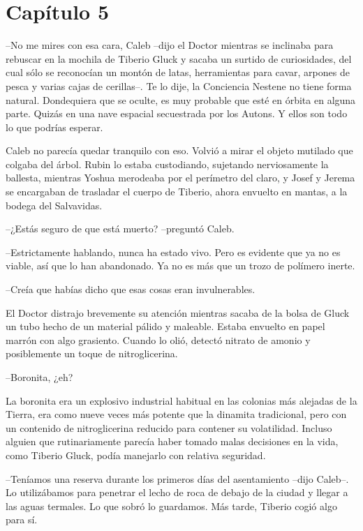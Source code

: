 \chapter*{Capítulo 5}

--No me mires con esa cara, Caleb --dijo el Doctor mientras se inclinaba para rebuscar en la mochila de Tiberio Gluck y sacaba un surtido de curiosidades, del cual sólo se reconocían un montón de latas, herramientas para cavar, arpones de pesca y varias cajas de cerillas--. Te lo dije, la Conciencia Nestene no tiene forma natural. Dondequiera que se oculte, es muy probable que esté en órbita en alguna parte. Quizás en una nave espacial secuestrada por los Autons. Y ellos son todo lo que podrías esperar.
 
Caleb no parecía quedar tranquilo con eso. Volvió a mirar el objeto mutilado que colgaba del árbol. Rubin lo estaba custodiando, sujetando nerviosamente la ballesta, mientras Yoshua merodeaba por el perímetro del claro, y Josef y Jerema se encargaban de trasladar el cuerpo de Tiberio, ahora envuelto en mantas, a la bodega del Salvavidas.
 
--¿Estás seguro de que está muerto? --preguntó Caleb.
 
--Estrictamente hablando, nunca ha estado vivo. Pero es evidente que ya no es viable, así que lo han abandonado. Ya no es más que un trozo de polímero inerte.
 
--Creía que habías dicho que esas cosas eran invulnerables.
 
El Doctor distrajo brevemente su atención mientras sacaba de la bolsa de Gluck un tubo hecho de un material pálido y maleable. Estaba envuelto en papel marrón con algo grasiento. Cuando lo olió, detectó nitrato de amonio y posiblemente un toque de nitroglicerina.
 
--Boronita, ¿eh?
 
La boronita era un explosivo industrial habitual en las colonias más alejadas de la Tierra, era como nueve veces más potente que la dinamita tradicional, pero con un contenido de nitroglicerina reducido para contener su volatilidad. Incluso alguien que rutinariamente parecía haber tomado malas decisiones en la vida, como Tiberio Gluck, podía manejarlo con relativa seguridad.
 
--Teníamos una reserva durante los primeros días del asentamiento --dijo Caleb--. Lo utilizábamos para penetrar el lecho de roca de debajo de la ciudad y llegar a las aguas termales. Lo que sobró lo guardamos. Más tarde, Tiberio cogió algo para sí.
 

